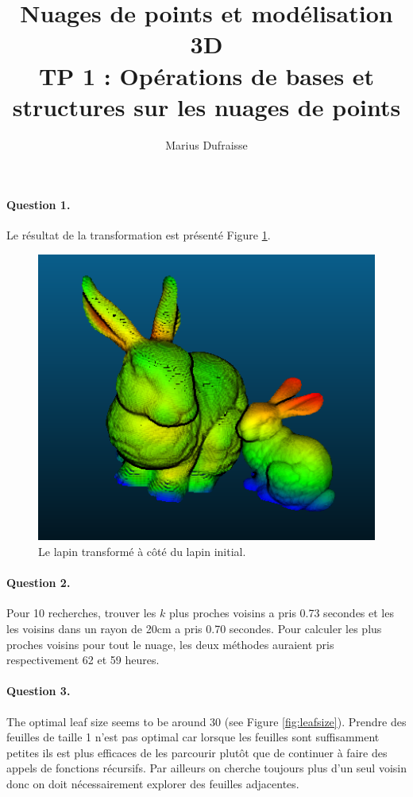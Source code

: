 \documentclass[french]{article}
\begin{document}
\title{Nuages de points et modélisation 3D\\
TP 1 : Opérations de bases et structures sur les nuages de points}
\author{Marius Dufraisse}
\date{}

\maketitle


\paragraph{Question 1.} Le résultat de la transformation est présenté Figure \ref{fig:q1}.
\begin{figure}[h]
	\centering
	\includegraphics[width=0.55\linewidth]{q1}
	\caption{Le lapin transformé à côté du lapin initial.}
	\label{fig:q1}
\end{figure}

\paragraph{Question 2.} Pour 10 recherches, trouver les $k$ plus proches voisins a pris 0.73 secondes et les les voisins dans un rayon de 20cm a pris 0.70 secondes. Pour calculer les plus proches voisins pour tout le nuage, les deux méthodes auraient pris respectivement 62 et 59 heures.

\paragraph{Question 3.} The optimal leaf size seems to be around 30 (see Figure \ref{fig:leafsize}). Prendre des feuilles de  taille 1 n'est pas optimal car lorsque les feuilles sont suffisamment petites ils est plus efficaces de les parcourir plutôt que de continuer à faire des appels de fonctions récursifs. Par ailleurs on cherche toujours plus d'un seul voisin donc on doit nécessairement explorer des feuilles adjacentes.
\end{document}
